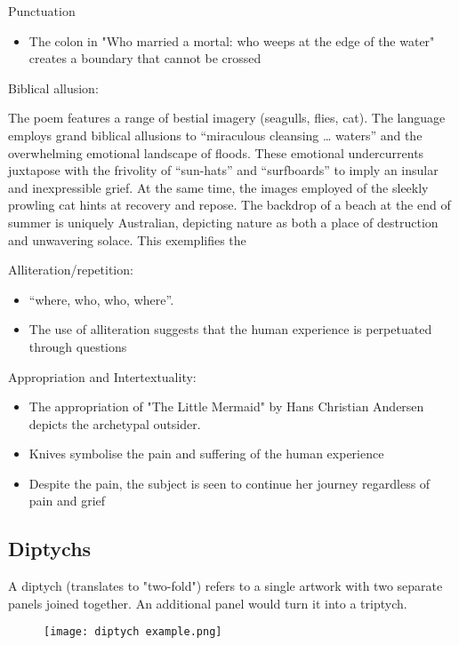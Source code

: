 		Punctuation
		\begin{itemize}
			\item The colon in "Who married a mortal: who weeps at the edge of the water" creates a boundary that cannot be crossed
		\end{itemize}

		Biblical allusion:

			\subitem The poem features a range of bestial imagery (seagulls, flies, cat). The language employs grand biblical allusions to “miraculous cleansing … waters” and the overwhelming emotional landscape of floods. These emotional undercurrents juxtapose with the frivolity of “sun-hats” and “surfboards” to imply an insular and inexpressible grief. At the same time, the images employed of the sleekly prowling cat hints at recovery and repose. The backdrop of a beach at the end of summer is uniquely Australian, depicting nature as both a place of destruction and unwavering solace. This exemplifies the 

		Alliteration/repetition:
		\begin{itemize}
			\item “where, who, who, where”.
			\item The use of alliteration suggests that the human experience is perpetuated through questions
		\end{itemize}
		
		Appropriation and Intertextuality:
		\begin{itemize}
			\item The appropriation of "The Little Mermaid" by Hans Christian Andersen depicts the archetypal outsider.
			\item Knives symbolise the pain and suffering of the human experience
			\item Despite the pain, the subject is seen to continue her journey regardless of pain and grief
		\end{itemize}
	
		\newpage

	\subsection{Diptychs}
		A diptych (translates to "two-fold") refers to a single artwork with two separate panels joined together. An additional panel would turn it into a triptych.
		\begin{figure}[H]
			\centering
			\texttt{[image: diptych example.png]}
		\end{figure}

